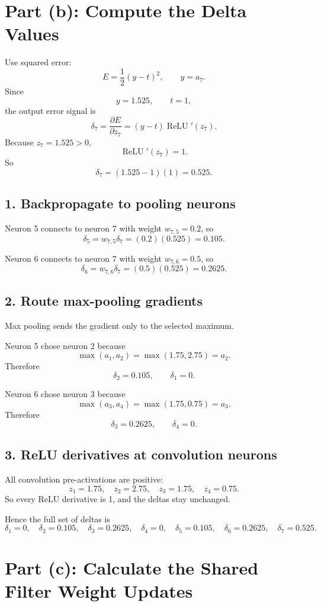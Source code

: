 \documentclass[11pt]{article}
\begin{document}
\section*{Part (b): Compute the Delta Values}

Use squared error:
\[
E=\frac12(y-t)^2,
\qquad y=a_7.
\]
Since
\[
y=1.525,\qquad t=1,
\]
the output error signal is
\[
\delta_7=\frac{\partial E}{\partial z_7}
=(y-t)\operatorname{ReLU}'(z_7).
\]
Because $z_7=1.525>0$,
\[
\operatorname{ReLU}'(z_7)=1.
\]
So
\[
\delta_7=(1.525-1)(1)=0.525.
\]

\subsection*{1. Backpropagate to pooling neurons}

Neuron 5 connects to neuron 7 with weight $w_{7,5}=0.2$, so
\[
\delta_5=w_{7,5}\delta_7=(0.2)(0.525)=0.105.
\]

Neuron 6 connects to neuron 7 with weight $w_{7,6}=0.5$, so
\[
\delta_6=w_{7,6}\delta_7=(0.5)(0.525)=0.2625.
\]

\subsection*{2. Route max-pooling gradients}

Max pooling sends the gradient only to the selected maximum.

Neuron 5 chose neuron 2 because
\[
\max(a_1,a_2)=\max(1.75,2.75)=a_2.
\]
Therefore
\[
\delta_2=0.105,\qquad \delta_1=0.
\]

Neuron 6 chose neuron 3 because
\[
\max(a_3,a_4)=\max(1.75,0.75)=a_3.
\]
Therefore
\[
\delta_3=0.2625,\qquad \delta_4=0.
\]

\subsection*{3. ReLU derivatives at convolution neurons}

All convolution pre-activations are positive:
\[
z_1=1.75,\quad z_2=2.75,\quad z_3=1.75,\quad z_4=0.75.
\]
So every ReLU derivative is 1, and the deltas stay unchanged.

Hence the full set of deltas is
\[
\boxed{
\delta_1=0,\quad
\delta_2=0.105,\quad
\delta_3=0.2625,\quad
\delta_4=0,\quad
\delta_5=0.105,\quad
\delta_6=0.2625,\quad
\delta_7=0.525.
}
\]

\section*{Part (c): Calculate the Shared Filter Weight Updates}
\end{document}
